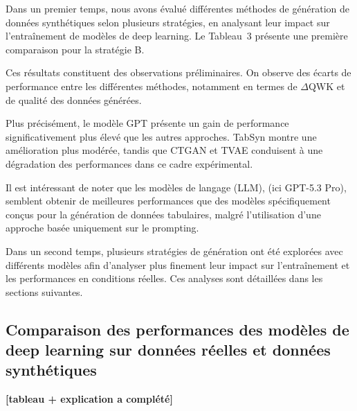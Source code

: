 \documentclass[conference]{IEEEtran}
\begin{document}
\begin{table}[h]
\centering
{}
\caption{Comparaison des méthodes de génération (stratégie B)}
\end{table}

Dans un premier temps, nous avons évalué différentes méthodes de génération de données synthétiques selon plusieurs stratégies, en analysant leur impact sur l’entraînement de modèles de deep learning. Le Tableau~3 présente une première comparaison pour la stratégie B.

Ces résultats constituent des observations préliminaires. On observe des écarts de performance entre les différentes méthodes, notamment en termes de $\Delta$QWK et de qualité des données générées.


Plus précisément, le modèle GPT présente un gain de performance significativement plus élevé que les autres approches. TabSyn montre une amélioration plus modérée, tandis que CTGAN et TVAE conduisent à une dégradation des performances dans ce cadre expérimental.

Il est intéressant de noter que les modèles de langage (LLM), (ici GPT-5.3 Pro), semblent obtenir de meilleures performances que des modèles spécifiquement conçus pour la génération de données tabulaires, malgré l’utilisation d’une approche basée uniquement sur le prompting.

Dans un second temps, plusieurs stratégies de génération ont été explorées avec différents modèles afin d’analyser plus finement leur impact sur l’entraînement et les performances en conditions réelles. Ces analyses sont détaillées dans les sections suivantes.

\subsection{Comparaison des performances des modèles de deep learning sur données réelles et données synthétiques}


\textbf{[tableau + explication a complété]}
\end{document}
